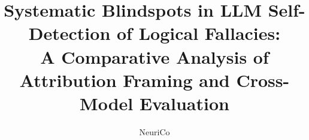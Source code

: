 \documentclass{article}
\title{Systematic Blindspots in LLM Self-Detection of Logical Fallacies:\\ A Comparative Analysis of Attribution Framing and Cross-Model Evaluation}
\author{NeuriCo}
\begin{document}
\maketitle

\begin{abstract}

\end{abstract}










\end{document}
